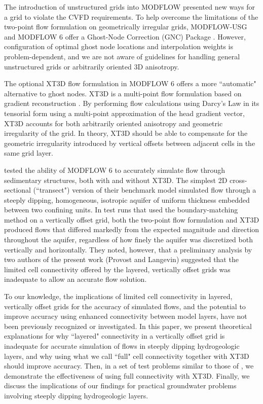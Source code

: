 \documentclass{article}
\begin{document}
The introduction of unstructured grids into MODFLOW \citep{modflowusg, modflow6gwf} presented new ways for a grid to violate the CVFD requirements. To help overcome the limitations of the two-point flow formulation on geometrically irregular grids, MODFLOW-USG and MODFLOW 6 offer a Ghost-Node Correction (GNC) Package \citep{modflowusg, modflow6gwf}. However, configuration of optimal ghost node locations and interpolation weights is problem-dependent, and we are not aware of guidelines for handling general unstructured grids or arbitrarily oriented 3D anisotropy.

The optional XT3D flow formulation \citep{modflow6xt3d} in MODFLOW 6 offers a more ``automatic" alternative to ghost nodes. XT3D is a multi-point flow formulation \citep{edwards1998, aavatsmark2002} based on gradient reconstruction \citep{mavriplis2003leastsq, diskin2008accuracy}. By performing flow calculations using Darcy's Law in its tensorial form using a multi-point approximation of the head gradient vector, XT3D accounts for both arbitrarily oriented anisotropy and geometric irregularity of the grid. In theory, XT3D should be able to compensate for the geometric irregularity introduced by vertical offsets between adjacent cells in the same grid layer.

\cite{bardot2023} tested the ability of MODFLOW 6 to accurately simulate flow through sedimentary structures, both with and without XT3D. The simplest 2D cross-sectional (``transect") version of their benchmark model simulated flow through a steeply dipping, homogeneous, isotropic aquifer of uniform thickness embedded between two confining units. In test runs that used the boundary-matching method on a vertically offset grid, both the two-point flow formulation and XT3D produced flows that differed markedly from the expected magnitude and direction throughout the aquifer, regardless of how finely the aquifer was discretized both vertically and horizontally. They noted, however, that a preliminary analysis by two authors of the present work (Provost and Langevin) suggested that the limited cell connectivity offered by the layered, vertically offset grids was inadequate to allow an accurate flow solution.

To our knowledge, the implications of limited cell connectivity in layered, vertically offset grids for the accuracy of simulated flows, and the potential to improve accuracy using enhanced connectivity between model layers, have not been previously recognized or investigated. In this paper, we present theoretical explanations for why ``layered" connectivity in a vertically offset grid is inadequate for accurate simulation of flows in steeply dipping hydrogeologic layers, and why using what we call ``full" cell connectivity together with XT3D should improve accuracy. Then, in a set of test problems similar to those of \cite{bardot2023}, we demonstrate the effectiveness of using full connectivity with XT3D. Finally, we discuss the implications of our findings for practical groundwater problems involving steeply dipping hydrogeologic layers.
\end{document}
